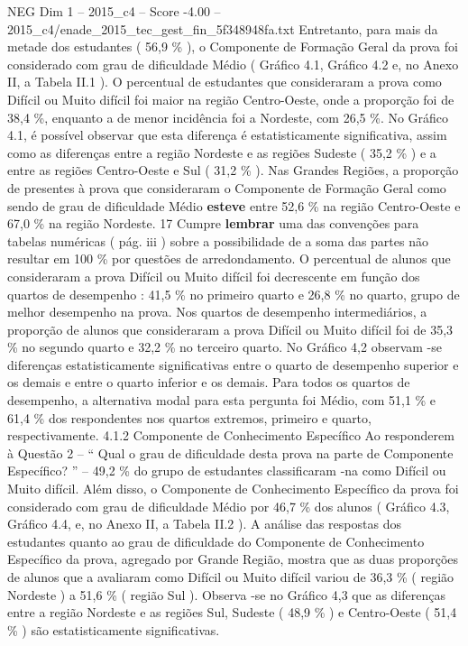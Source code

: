 \begin{textsample}{NEG Dim 1 – 2015\_c4 – Score -4.00 – 2015\_c4/enade\_2015\_tec\_gest\_fin\_5f348948fa.txt}
Entretanto, para mais da metade dos estudantes ( 56,9 \% ), o Componente de Formação Geral da prova foi considerado com grau de dificuldade Médio ( Gráfico 4.1, Gráfico 4.2 e, no Anexo II, a Tabela II.1 ).
O percentual de estudantes que consideraram a prova como Difícil ou Muito difícil foi maior na região Centro-Oeste, onde a proporção foi de 38,4 \%, enquanto a de menor incidência foi a Nordeste, com 26,5 \%.
No Gráfico 4.1, é possível observar que esta diferença é estatisticamente significativa, assim como as diferenças entre a região Nordeste e as regiões Sudeste ( 35,2 \% ) e a entre as regiões Centro-Oeste e Sul ( 31,2 \% ).
Nas Grandes Regiões, a proporção de presentes à prova que consideraram o Componente de Formação Geral como sendo de grau de dificuldade Médio \textbf{esteve} entre 52,6 \% na região Centro-Oeste e 67,0 \% na região Nordeste. 17 Cumpre \textbf{lembrar} uma das convenções para tabelas numéricas ( pág. iii ) sobre a possibilidade de a soma das partes não resultar em 100 \% por questões de arredondamento.
O percentual de alunos que consideraram a prova Difícil ou Muito difícil foi decrescente em função dos quartos de desempenho : 41,5 \% no primeiro quarto e 26,8 \% no quarto, grupo de melhor desempenho na prova.
Nos quartos de desempenho intermediários, a proporção de alunos que consideraram a prova Difícil ou Muito difícil foi de 35,3 \% no segundo quarto e 32,2 \% no terceiro quarto.
No Gráfico 4,2 observam -se diferenças estatisticamente significativas entre o quarto de desempenho superior e os demais e entre o quarto inferior e os demais.
Para todos os quartos de desempenho, a alternativa modal para esta pergunta foi Médio, com 51,1 \% e 61,4 \% dos respondentes nos quartos extremos, primeiro e quarto, respectivamente. 4.1.2 Componente de Conhecimento Específico Ao responderem à Questão 2 – “ Qual o grau de dificuldade desta prova na parte de Componente Específico? ” – 49,2 \% do grupo de estudantes classificaram -na como Difícil ou Muito difícil.
Além disso, o Componente de Conhecimento Específico da prova foi considerado com grau de dificuldade Médio por 46,7 \% dos alunos ( Gráfico 4.3, Gráfico 4.4, e, no Anexo II, a Tabela II.2 ).
A análise das respostas dos estudantes quanto ao grau de dificuldade do Componente de Conhecimento Específico da prova, agregado por Grande Região, mostra que as duas proporções de alunos que a avaliaram como Difícil ou Muito difícil variou de 36,3 \% ( região Nordeste ) a 51,6 \% ( região Sul ).
Observa -se no Gráfico 4,3 que as diferenças entre a região Nordeste e as regiões Sul, Sudeste ( 48,9 \% ) e Centro-Oeste ( 51,4 \% ) são estatisticamente significativas.

\end{textsample}

